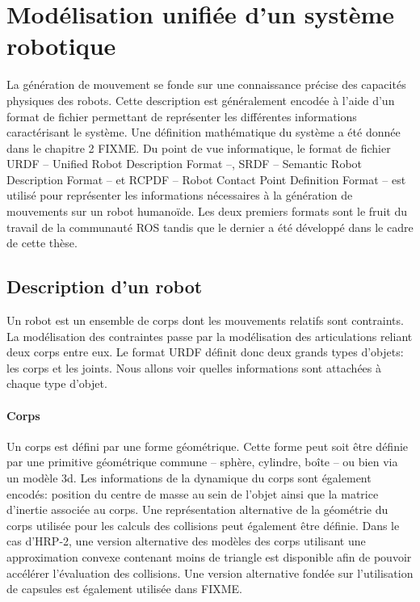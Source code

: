 \section{Modélisation unifiée d'un système robotique}


La génération de mouvement se fonde sur une connaissance précise des
capacités physiques des robots. Cette description est généralement
encodée à l'aide d'un format de fichier permettant de représenter les
différentes informations caractérisant le système. Une définition
mathématique du système a été donnée dans le chapitre 2 FIXME. Du
point de vue informatique, le format de fichier URDF -- Unified Robot
Description Format --, SRDF -- Semantic Robot Description Format -- et
RCPDF -- Robot Contact Point Definition Format -- est utilisé pour
représenter les informations nécessaires à la génération de mouvements
sur un robot humanoïde. Les deux premiers formats sont le fruit du
travail de la communauté ROS tandis que le dernier a été développé
dans le cadre de cette thèse.

\subsection{Description d'un robot}


Un robot est un ensemble de corps dont les mouvements relatifs sont
contraints. La modélisation des contraintes passe par la modélisation
des articulations reliant deux corps entre eux. Le format URDF définit
donc deux grands types d'objets: les corps et les joints. Nous allons
voir quelles informations sont attachées à chaque type d'objet.

\paragraph{Corps}

Un corps est défini par une forme géométrique. Cette forme peut soit
être définie par une primitive géométrique commune -- sphère,
cylindre, boîte -- ou bien via un modèle 3d. Les informations de la
dynamique du corps sont également encodés: position du centre de masse
au sein de l'objet ainsi que la matrice d'inertie associée au
corps. Une représentation alternative de la géométrie du corps
utilisée pour les calculs des collisions peut également être
définie. Dans le cas d'HRP-2, une version alternative des modèles des
corps utilisant une approximation convexe contenant moins de triangle
est disponible afin de pouvoir accélérer l'évaluation des
collisions. Une version alternative fondée sur l'utilisation de
capsules est également utilisée dans FIXME.


